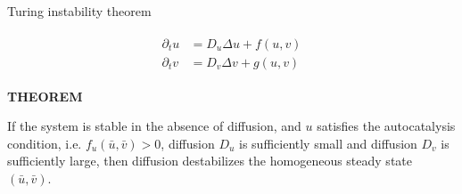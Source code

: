 \begin{frame}{Turing instability theorem}

  \vspace{-0.28cm}

  {\color{HydraWhite}\bfseries\fontsize{9.8}{12.5}\selectfont
  \begin{align*}
    \boxed{
      \begin{aligned}
        \partial_tu&=D_u\Delta u+f(u,v)
        \\
        \partial_tv&=D_v\Delta v+g(u,v)
      \end{aligned}
    }
  \end{align*}
  }

  \vspace{+0.34cm}

  {\color{HydraGold}\bfseries\fontsize{7.8}{9.4}\selectfont
    THEOREM\par}

  \vspace{0.14cm}

  {\color{HydraWhite}\fontsize{9.2}{12}\selectfont
    If the system is stable in the absence of diffusion, and $u$ satisfies the autocatalysis condition, i.e.
    $f_u(\bar u,\bar v)>0$, diffusion $D_u$ is sufficiently small and diffusion $D_v$ is
    sufficiently large, then diffusion destabilizes the homogeneous steady
    state $(\bar u,\bar v)$.
  \par}

\end{frame}




